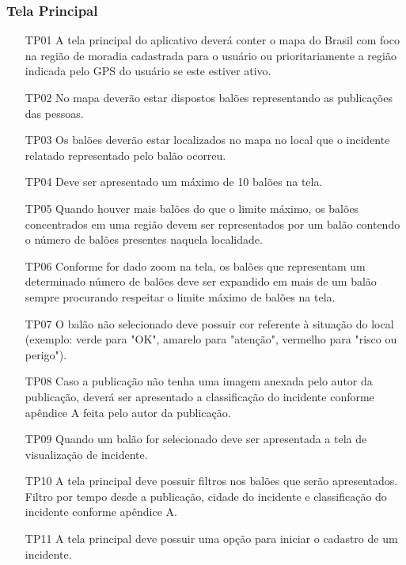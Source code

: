 \documentclass[12pt]{article}
\begin{document}
\subsubsection{Tela Principal}
\begin{enumerate}
    \item [TP01] A tela principal do aplicativo deverá conter o mapa do Brasil com foco na região de moradia cadastrada para o usuário ou prioritariamente a região indicada pelo GPS do usuário se este estiver ativo.
    \item [TP02] No mapa deverão estar dispostos balões representando as publicações das pessoas.
    \item [TP03] Os balões deverão estar localizados no mapa no local que o incidente relatado representado pelo balão ocorreu.
    \item [TP04] Deve ser apresentado um máximo de 10 balões na tela.
    \item [TP05] Quando houver mais balões do que o limite máximo, os balões concentrados em uma região devem ser representados por um balão contendo o número de balões presentes naquela localidade.
    \item [TP06] Conforme for dado zoom na tela, os balões que representam um determinado número de balões deve ser expandido em mais de um balão sempre procurando respeitar o limite máximo de balões na tela.
    \item [TP07] O balão não selecionado deve possuir cor referente à situação do local (exemplo: verde para "OK", amarelo para "atenção", vermelho para "risco ou perigo").
    \item [TP08] Caso a publicação não tenha uma imagem anexada pelo autor da publicação, deverá ser apresentado a classificação do incidente conforme apêndice A feita pelo autor da publicação.
    \item [TP09] Quando um balão for selecionado deve ser apresentada a tela de visualização de incidente.
    \item [TP10] A tela principal deve possuir filtros nos balões que serão apresentados. Filtro por tempo desde a publicação, cidade do incidente e classificação do incidente conforme apêndice A.
    \item [TP11] A tela principal deve possuir uma opção para iniciar o cadastro de um incidente.

\end{enumerate}
\end{document}
